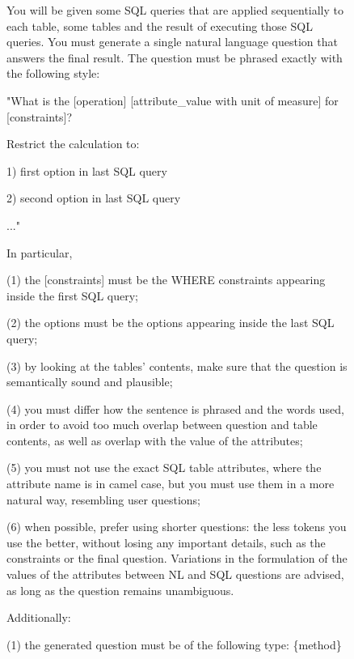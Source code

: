\begin{figure}[t!]\small
\centering
\begin{tcolorbox}[
  title=Sequential question generation prompt,
  fonttitle=\bfseries,
  sharp corners=all,
]

You will be given some SQL queries that are applied sequentially to each table, some tables and the result of executing those SQL queries.
You must generate a single natural language question that answers the final result. The question must be phrased exactly with the following style:

\vspace{\baselineskip}
"What is the [operation] [attribute\_value with unit of measure] for [constraints]?

Restrict the calculation to:

1) first option in last SQL query

2) second option in last SQL query

..."

\vspace{\baselineskip}
In particular,

(1) the [constraints] must be the WHERE constraints appearing inside the first SQL query;

(2) the options must be the options appearing inside the last SQL query;

(3) by looking at the tables' contents, make sure that the question is semantically sound and plausible;

(4) you must differ how the sentence is phrased and the words used, in order to avoid too much overlap between question and table contents, as well as overlap with the value of the attributes;

(5) you must not use the exact SQL table attributes, where the attribute name is in camel case, but you must use them in a more natural way, resembling user questions;

(6) when possible, prefer using shorter questions: the less tokens you use the better, without losing any important details, such as the constraints or the final question. Variations in the formulation of the values of the attributes between NL and SQL questions are advised, as long as the question remains unambiguous.

\vspace{\baselineskip}
Additionally:

(1) the generated question must be of the following type: \{method\}


\end{tcolorbox}
\end{figure}
